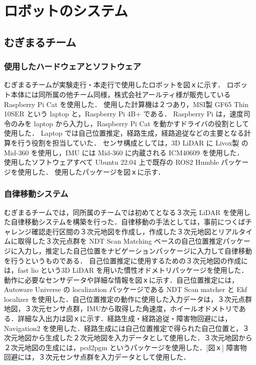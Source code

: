 \documentclass[twocolumn,9pt]{jsproceedings}
\begin{document}
\section{ロボットのシステム}

\subsection{むぎまるチーム}

\subsubsection{使用したハードウェアとソフトウェア}

むぎまるチームが実験走行・本走行で使用したロボットを図ｘに示す．
ロボット本体には同所属の他チーム同様，株式会社アールティ様が販売している Raspberry Pi Cat を使用した．
使用した計算機は２つあり，MSI製 GF65 Thin 10SER という laptop と，Raspberry Pi 4B+ である．
Raspberry Pi は，速度司令のみを laptop から入力し，Raspberry Pi Cat を動かすドライバの役割として使用した．
Laptop では自己位置推定，経路生成，経路追従などの主要となる計算を行う役割を担当していた．
センサ構成としては，3D LiDAR に Livox製 の Mid-360 を使用し，IMU には Mid-360 に内蔵される ICM40609 を使用した．
使用したソフトウェアすべて Ubuntu 22.04 上で既存の ROS2 Humble パッケージを使用した．
使用したパッケージを図ｘに示す．

\subsubsection{自律移動システム}

むぎまるチームでは，同所属のチームでは初めてとなる３次元 LiDAR を使用した自律移動システムを構築を行った．自律移動の手法としては，事前につくばチャレンジ確認走行区間の３次元地図を作成し，作成した３次元地図とリアルタイムに取得した３次元点群を NDT Scan Matching ベースの自己位置推定パッケージに入力し，推定した自己位置をナビゲーションパッケージに入力して自律移動を行うというものである．
自己位置推定に使用するための３次元地図の作成には，fast lio という3D LiDAR を用いた慣性オドメトリパッケージを使用した．動作に必要なセンサデータや詳細な情報を図ｘに示す．自己位置推定には，Autoware Universe の localization パッケージである NDT Scan matcher と Ekf localizer を使用した．自己位置推定の動作に使用した入力データは，３次元点群地図，３次元センサ点群，IMUから取得した角速度，ホイールオドメトリである．詳細な入出力は図ｘに示す．経路生成・経路追従・障害物回避には，Navigation2 を使用した．経路生成には自己位置推定で得られた自己位置と，３次元地図から生成した２次元地図を入力データとして使用した．３次元地図から２次元地図の生成には，pcd2pgm というパッケージを使用した．[図ｘ] 障害物回避には，３次元センサ点群を入力データとして使用した．
\end{document}
